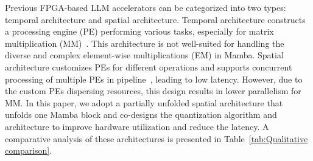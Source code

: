 
Previous FPGA-based LLM accelerators can be categorized into two types: temporal architecture and spatial architecture. 
Temporal architecture constructs a processing engine (PE) performing various tasks, especially for matrix multiplication (MM)~\cite{DFX,Flightllm,enhancing}. 
This architecture is not well-suited for handling the diverse and complex element-wise multiplications (EM) in Mamba.
Spatial architecture customizes PEs for different operations and supports concurrent processing of multiple PEs 
in pipeline~\cite{understanding,HGPIPE,ftrans,adaptable},
leading to low latency.
However, due to the custom PEs dispersing resources, this design results in lower parallelism for MM.
In this paper, we adopt a partially unfolded spatial architecture that unfolds 
one Mamba block and co-designs the quantization algorithm and architecture to improve hardware utilization and
reduce the latency.
A comparative analysis of these architectures is presented in Table~\ref{tab:Qualitative comparison}.


